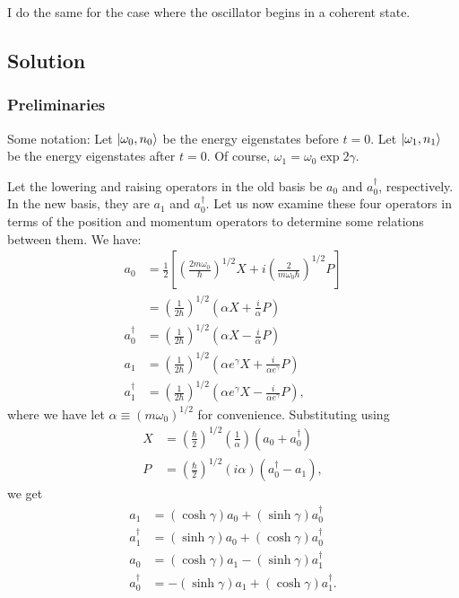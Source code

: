 \documentclass[12pt]{article}
\begin{document}
I do the same for the case where the oscillator begins in a coherent state.

\subsection*{Solution}

\subsubsection*{Preliminaries}

Some notation: Let $\ket{\omega_0,n_0}$ be the energy eigenstates before $t=0.$ Let $\ket{\omega_1,n_1}$ be the energy eigenstates after $t=0.$ Of course, $\omega_1=\omega_0\exp 2\gamma.$ 

Let the lowering and raising operators in the old basis be $a_0$ and $a_0^{\dagger}$, respectively.  In the new basis, they are $a_1$ and $a_0^{\dagger}$.  Let us now examine these four operators in terms of the position and momentum operators to determine some relations between them.  We have:
\begin{align*}
	a_0 &= \frac{1}{2}\left[\left(\frac{2m\omega_0}{\hbar}\right)^{1/2}X + i\left(\frac{2}{m\omega_0\hbar}\right)^{1/2}P\right] \\
	    &= \left(\frac{1}{2\hbar}\right)^{1/2} \left(\alpha X + \frac{i}{\alpha}P\right) \\
	a_0^{\dagger} &= \left(\frac{1}{2\hbar}\right)^{1/2}\left(\alpha X - \frac{i}{\alpha}P\right) \\
	a_1 &= \left(\frac{1}{2\hbar}\right)^{1/2}\left(\alpha e^{\gamma} X + \frac{i}{\alpha e^{\gamma}}P\right) \\
	a_1^{\dagger} &= \left(\frac{1}{2\hbar}\right)^{1/2}\left(\alpha e^{\gamma} X - \frac{i}{\alpha e^{\gamma}}P\right),
\end{align*}
where we have let $\alpha \equiv  (m\omega_0)^{1/2}$ for convenience.  Substituting using
\begin{align*}
	X &= \left(\frac{\hbar}{2}\right)^{1/2}\left(\frac{1}{\alpha}\right)(a_0+a_0^{\dagger}) \\
	P &= \left(\frac{\hbar}{2}\right)^{1/2}(i\alpha)(a_0^{\dagger}-a_1),
\end{align*}
we get 
\begin{align*}
	a_1 &= (\cosh \gamma) a_0 + (\sinh \gamma) a_0^{\dagger} \\
	a_1^{\dagger} &= (\sinh \gamma) a_0 + (\cosh \gamma) a_0^{\dagger} \\
	a_0 &= (\cosh \gamma) a_1 - (\sinh \gamma) a_1^{\dagger} \\
	a_0^{\dagger} &= -(\sinh \gamma) a_1 + (\cosh \gamma) a_1^{\dagger}.
\end{align*}
\end{document}
